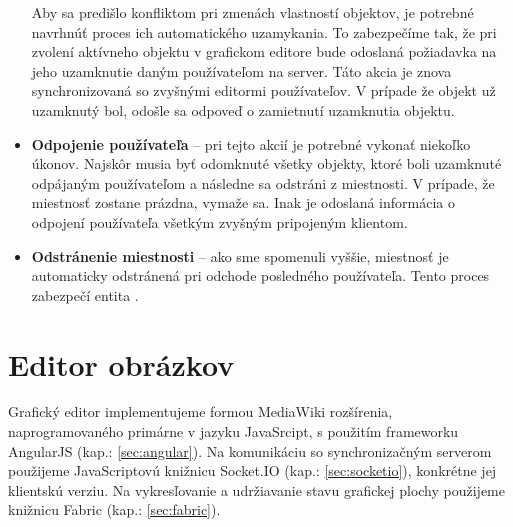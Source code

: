 \begin{itemize}
	Aby sa predišlo konfliktom pri zmenách vlastností objektov, je potrebné navrhnúť proces ich automatického uzamykania. To zabezpečíme tak, že pri zvolení aktívneho objektu v grafickom editore bude odoslaná požiadavka na jeho uzamknutie daným používateľom na server. Táto akcia je znova synchronizovaná so zvyšnými editormi používateľov. V prípade že objekt už uzamknutý bol, odošle sa odpoveď o zamietnutí uzamknutia objektu.
	
	\item \textbf{Odpojenie používateľa} -- pri tejto akcií je potrebné vykonať niekoľko úkonov. Najskôr musia byť odomknuté všetky objekty, ktoré boli uzamknuté odpájaným používateľom a následne sa odstráni z miestnosti. V prípade, že miestnosť zostane prázdna, vymaže sa. Inak je odoslaná informácia o odpojení používateľa všetkým zvyšným pripojeným klientom.
	
	\item \textbf{Odstránenie miestnosti} -- ako sme spomenuli vyššie, miestnosť je automaticky odstránená pri odchode posledného používateľa. Tento proces zabezpečí entita .
	
\end{itemize}

\section{Editor obrázkov}
Grafický editor implementujeme formou MediaWiki rozšírenia, naprogramovaného primárne v jazyku JavaSrcipt, s použitím frameworku AngularJS (kap.: \ref{sec:angular}). Na komunikáciu so synchronizačným serverom použijeme JavaScriptovú knižnicu Socket.IO (kap.: \ref{sec:socketio}), konkrétne jej klientskú verziu. Na vykresľovanie a udržiavanie stavu grafickej plochy použijeme knižnicu Fabric (kap.: \ref{sec:fabric}). 


